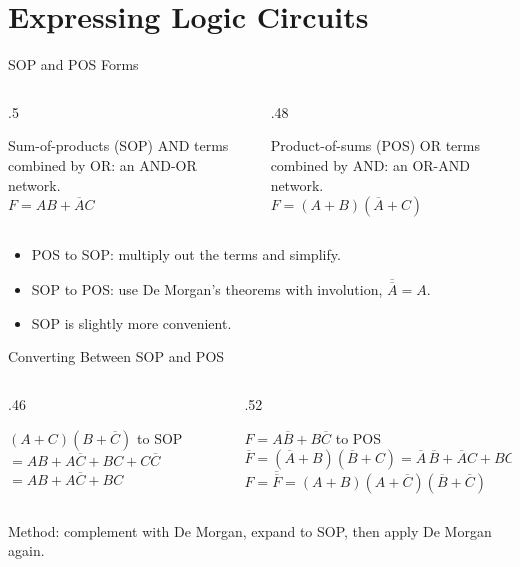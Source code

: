 \documentclass[9pt,aspectratio=169,xcolor=table]{beamer}
\begin{document}
\section{Expressing Logic Circuits}

\begin{frame}{SOP and POS Forms}
  \begin{columns}[t]
  \begin{column}{.5\textwidth}
    \begin{block}{Sum-of-products (SOP)}
      \small AND terms combined by OR: an \alert{AND-OR} network.\\
      $F = AB + \overline{A}C$
    \end{block}
  \end{column}
  \begin{column}{.48\textwidth}
    \begin{block}{Product-of-sums (POS)}
      \small OR terms combined by AND: an \alert{OR-AND} network.\\
      $F = (A+B)(\overline{A}+C)$
    \end{block}
  \end{column}
  \end{columns}
  \vspace{2mm}
  \begin{itemize}\small\itemsep2pt
    \item POS to SOP: multiply out the terms and simplify.
    \item SOP to POS: use De Morgan's theorems with involution, $\overline{\overline{A}} = A$.
    \item SOP is slightly more convenient.
  \end{itemize}
\end{frame}

\begin{frame}{Converting Between SOP and POS}
  \begin{columns}[t]
  \begin{column}{.46\textwidth}
    \begin{block}{$(A+C)(B+\overline{C})$ to SOP}
      \small
      $= AB + A\overline{C} + BC + C\overline{C}$\\
      $= AB + A\overline{C} + BC$
    \end{block}
  \end{column}
  \begin{column}{.52\textwidth}
    \begin{block}{$F = A\overline{B} + B\overline{C}$ to POS}
      \scriptsize
      $\overline{F} = (\overline{A}+B)(\overline{B}+C) = \overline{A}\,\overline{B} + \overline{A}C + BC$\\[1mm]
      $F = \overline{\overline{F}} = (A+B)(A+\overline{C})(\overline{B}+\overline{C})$
    \end{block}
  \end{column}
  \end{columns}
  \vspace{2mm}
  {\small Method: complement with De Morgan, expand to SOP, then apply De Morgan again.}
\end{frame}
\end{document}
